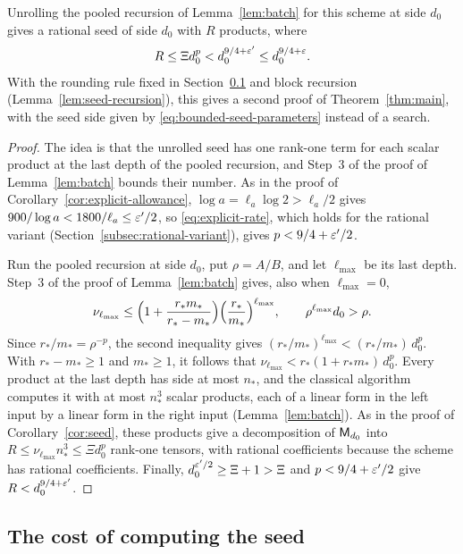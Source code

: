 \begin{theorem}\label{thm:bounded-seed}
Unrolling the pooled recursion of Lemma~\ref{lem:batch} for this scheme
at side \(d_0\) gives a rational seed of side \(d_0\) with \(R\)
products, where
\[
 R\le\Xi d_0^p<d_0^{9/4+\varepsilon'}\le d_0^{9/4+\varepsilon}.
\]
With the rounding rule fixed in Section~\ref{subsec:preprocessing-bounds}
and block recursion (Lemma~\ref{lem:seed-recursion}), this gives a
second proof of Theorem~\ref{thm:main}, with the seed side given by
\eqref{eq:bounded-seed-parameters} instead of a search.
\end{theorem}

\begin{proof}
The idea is that the unrolled seed has one rank-one term for each
scalar product at the last depth of the pooled recursion, and Step~3 of
the proof of Lemma~\ref{lem:batch} bounds their number. As in the proof
of Corollary~\ref{cor:explicit-allowance}, \(\log a=\ell_a\log2>\ell_a/2\)
gives \(900/\log a<1800/\ell_a\le\varepsilon'/2\), so
\eqref{eq:explicit-rate}, which holds for the rational variant
(Section~\ref{subsec:rational-variant}), gives \(p<9/4+\varepsilon'/2\).

Run the pooled recursion at side \(d_0\), put \(\rho=A/B\), and let
\(\ell_{\max}\) be its last depth. Step~3 of the proof of
Lemma~\ref{lem:batch} gives, also when \(\ell_{\max}=0\),
\[
 \nu_{\ell_{\max}}\le\Bigl(1+\frac{r_*m_*}{r_*-m_*}\Bigr)
 \Bigl(\frac{r_*}{m_*}\Bigr)^{\ell_{\max}},
 \qquad \rho^{\ell_{\max}}d_0>\rho .
\]
Since \(r_*/m_*=\rho^{-p}\), the second inequality gives
\((r_*/m_*)^{\ell_{\max}}<(r_*/m_*)\,d_0^p\). With
\(r_*-m_*\ge1\) and \(m_*\ge1\), it follows that
\(\nu_{\ell_{\max}}<r_*(1+r_*m_*)\,d_0^p\). Every product at
the last depth has side at most \(n_*\), and the classical algorithm
computes it with at most \(n_*^3\) scalar products, each of a linear
form in the left input by a linear form in the right input
(Lemma~\ref{lem:batch}). As in the proof of Corollary~\ref{cor:seed},
these products give a decomposition of \(\mathsf M_{d_0}\) into
\(R\le\nu_{\ell_{\max}}n_*^3\le\Xi d_0^p\) rank-one tensors, with
rational coefficients because the scheme has rational coefficients.
Finally, \(d_0^{\varepsilon'/2}\ge\Xi+1>\Xi\) and \(p<9/4+\varepsilon'/2\) give
\(R<d_0^{9/4+\varepsilon'}\).
\end{proof}

\subsection{The cost of computing the seed}
\label{subsec:preprocessing-bounds}

